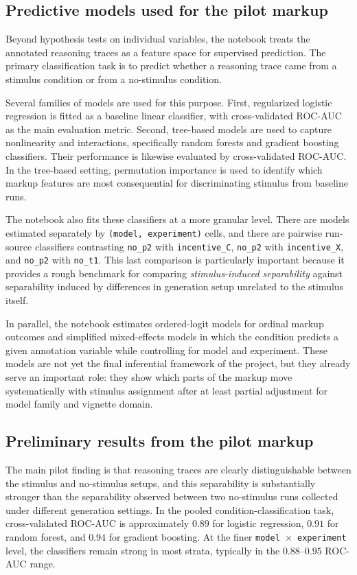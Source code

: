 \documentclass[14pt,a4paper]{extarticle}
\begin{document}
\subsection{Predictive models used for the pilot markup}

Beyond hypothesis tests on individual variables, the notebook treats the annotated reasoning traces as a feature space for supervised prediction. The primary classification task is to predict whether a reasoning trace came from a stimulus condition or from a no-stimulus condition.

Several families of models are used for this purpose. First, regularized logistic regression is fitted as a baseline linear classifier, with cross-validated ROC-AUC as the main evaluation metric. Second, tree-based models are used to capture nonlinearity and interactions, specifically random forests and gradient boosting classifiers. Their performance is likewise evaluated by cross-validated ROC-AUC. In the tree-based setting, permutation importance is used to identify which markup features are most consequential for discriminating stimulus from baseline runs.

The notebook also fits these classifiers at a more granular level. There are models estimated separately by \texttt{(model, experiment)} cells, and there are pairwise run-source classifiers contrasting \texttt{no\_p2} with \texttt{incentive\_C}, \texttt{no\_p2} with \texttt{incentive\_X}, and \texttt{no\_p2} with \texttt{no\_t1}. This last comparison is particularly important because it provides a rough benchmark for comparing \emph{stimulus-induced separability} against separability induced by differences in generation setup unrelated to the stimulus itself.

In parallel, the notebook estimates ordered-logit models for ordinal markup outcomes and simplified mixed-effects models in which the condition predicts a given annotation variable while controlling for model and experiment. These models are not yet the final inferential framework of the project, but they already serve an important role: they show which parts of the markup move systematically with stimulus assignment after at least partial adjustment for model family and vignette domain.

\subsection{Preliminary results from the pilot markup}

The main pilot finding is that reasoning traces are clearly distinguishable between the stimulus and no-stimulus setups, and this separability is substantially stronger than the separability observed between two no-stimulus runs collected under different generation settings. In the pooled condition-classification task, cross-validated ROC-AUC is approximately $0.89$ for logistic regression, $0.91$ for random forest, and $0.94$ for gradient boosting. At the finer \texttt{model $\times$ experiment} level, the classifiers remain strong in most strata, typically in the $0.88$--$0.95$ ROC-AUC range.
\end{document}
